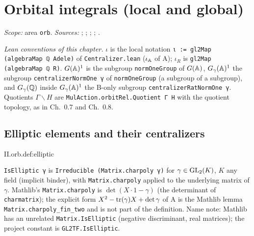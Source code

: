 \chapter{Orbital integrals (local and global)}\label{ch:ch-04-orbital}

\noindent\emph{Scope:} area \texttt{orb}. \emph{Sources:} \cite[§8]{A-I}; \cite[§§10--11]{AIntro}; \cite[Lecture II §§1--2, Lecture IV §1]{Gel}; \cite{A-WOI}; \cite[§16]{JL}.

\noindent\emph{Lean conventions of this chapter.} $\iota$ is the local notation \texttt{ι := gl2Map (algebraMap ℚ Adele)} of
\texttt{Centralizer.lean} ($\iota_{\mathbb{A}}$ of A); $\iota_R$ is \texttt{gl2Map (algebraMap ℚ R)}. $G(\mathbb{A})^1$ is the subgroup \texttt{normOneGroup} of
$G(\mathbb{A})$, $G_\gamma(\mathbb{A})^1$ the subgroup \texttt{centralizerNormOne γ} of \texttt{normOneGroup} (a subgroup of a subgroup), and $G_\gamma(\mathbb{Q})$
inside $G_\gamma(\mathbb{A})^1$ the B-only subgroup \texttt{centralizerRatNormOne γ}. Quotients $\Gamma\backslash H$ are
\texttt{MulAction.orbitRel.Quotient Γ H} with the quotient topology, as in Ch.~0.7 and Ch.~0.8.

\section{Elliptic elements and their centralizers}\label{sec:orb-centralizer}

\begin{definition}
\end{definition}
\begin{tfformal}{II.orb.def:elliptic}
\begin{tffidelity}
\texttt{IsElliptic γ} is \texttt{Irreducible (Matrix.charpoly γ)} for $\gamma\in\mathrm{GL}_2(K)$, $K$ any field (implicit binder), with \texttt{Matrix.charpoly} applied to the underlying matrix of $\gamma$. Mathlib's \texttt{Matrix.charpoly} is $\det(X\cdot1-\gamma)$ (the determinant of \texttt{charmatrix}); the explicit form $X^2-\operatorname{tr}(\gamma)X+\det\gamma$ of A is the Mathlib lemma \texttt{Matrix.charpoly\_fin\_two} and is not part of the definition. Name note: Mathlib has an unrelated \texttt{Matrix.IsElliptic} (negative discriminant, real matrices); the project constant is \texttt{GL2TF.IsElliptic}.
\end{tffidelity}
\end{tfformal}

